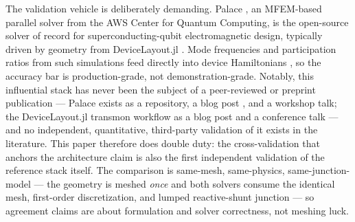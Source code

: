 \documentclass{anvil-paper}
\begin{document}
The validation vehicle is deliberately demanding. Palace \citep{palace},
an MFEM-based \citep{mfem,andrej2024high} parallel solver from the AWS
Center for Quantum Computing, is the open-source solver of record for
superconducting-qubit electromagnetic design, typically driven by geometry
from DeviceLayout.jl \citep{devicelayout,devicelayout-blog}. Mode
frequencies and participation ratios from such simulations feed directly
into device Hamiltonians \citep{koch2007,nigg2012,minev2021}, so the
accuracy bar is production-grade, not demonstration-grade. Notably, this
influential stack has never been the subject of a peer-reviewed or
preprint publication --- Palace exists as a repository, a blog post
\citep{palace-blog}, and a workshop talk; the DeviceLayout.jl transmon
workflow as a blog post and a conference talk
\citep{devicelayout-blog,devicelayout-juliacon} --- and no independent,
quantitative, third-party validation of it exists in the literature. This
paper therefore does double duty: the cross-validation that anchors the
architecture claim is also the first independent validation of the
reference stack itself. The comparison is same-mesh, same-physics,
same-junction-model --- the geometry is meshed \emph{once} and both
solvers consume the identical mesh, first-order discretization, and lumped
reactive-shunt junction --- so agreement claims are about formulation and
solver correctness, not meshing luck.
\end{document}
